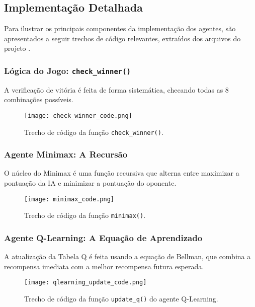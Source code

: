 \documentclass[conference]{IEEEtran}
\begin{document}
\subsection{Implementação Detalhada}
Para ilustrar os principais componentes da implementação dos agentes, são apresentados a seguir trechos de código relevantes, extraídos dos arquivos do projeto \cite{sarpa2024}.

\subsubsection{Lógica do Jogo: \texttt{check\_winner()}}

A verificação de vitória é feita de forma sistemática, checando todas as 8 combinações possíveis.

\begin{figure}[H] %
  \centering
  \texttt{[image: check\_winner\_code.png]} %
  \caption{Trecho de código da função \texttt{check\_winner()}.}
  \label{fig:check_winner_code}
\end{figure}

\subsubsection{Agente Minimax: A Recursão}

O núcleo do Minimax é uma função recursiva que alterna entre maximizar a pontuação da IA e minimizar a pontuação do oponente.

\begin{figure}[H]
  \centering
  \texttt{[image: minimax\_code.png]}
  \caption{Trecho de código da função \texttt{minimax()}.}
  \label{fig:minimax_code}
\end{figure}

\subsubsection{Agente Q-Learning: A Equação de Aprendizado}

A atualização da Tabela Q é feita usando a equação de Bellman, que combina a recompensa imediata com a melhor recompensa futura esperada.

\begin{figure}[H]
  \centering
  \texttt{[image: qlearning\_update\_code.png]}
  \caption{Trecho de código da função \texttt{update\_q()} do agente Q-Learning.}
  \label{fig:qlearning_update_code}
\end{figure}
\end{document}
